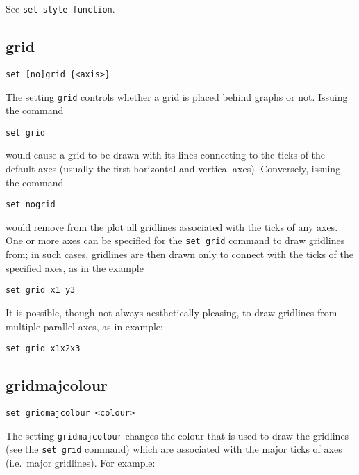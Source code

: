 See {\tt set style function}.


\subsection{grid}

\begin{verbatim}
set [no]grid {<axis>}
\end{verbatim}

The setting {\tt grid} controls whether a grid is placed behind graphs or not.
Issuing the command

\begin{verbatim}
set grid
\end{verbatim}

\noindent would cause a grid to be drawn with its lines connecting to the ticks
of the default axes (usually the first horizontal and vertical axes).
Conversely, issuing the command

\begin{verbatim}
set nogrid
\end{verbatim}

\noindent would remove from the plot all gridlines associated with the ticks of
any axes.  One or more axes can be specified for the {\tt set grid} command to
draw gridlines from; in such cases, gridlines are then drawn only to connect
with the ticks of the specified axes, as in the example

\begin{verbatim}
set grid x1 y3
\end{verbatim}

It is possible, though not always aesthetically pleasing, to draw gridlines
from multiple parallel axes, as in example:

\begin{verbatim}
set grid x1x2x3
\end{verbatim}


\subsection{gridmajcolour}

\begin{verbatim}
set gridmajcolour <colour>
\end{verbatim}

The setting {\tt gridmajcolour} changes the colour that is used to draw the
gridlines (see the {\tt set grid} command) which are associated with the major
ticks of axes (i.e.\ major gridlines). For example:

